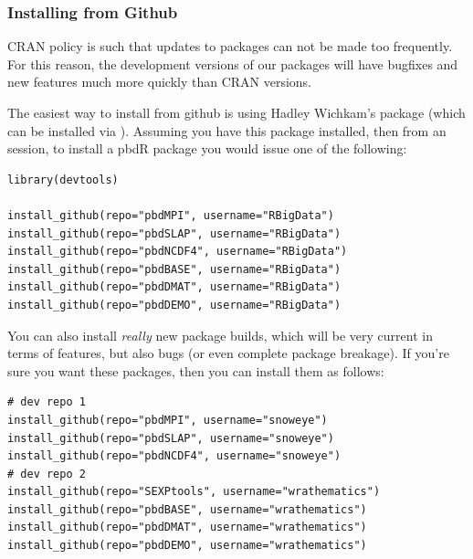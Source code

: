 \subsubsection{Installing from Github}
CRAN policy is such that updates to packages can not be made too frequently.  For this reason, the development versions of our packages will have bugfixes and new features much more quickly than CRAN versions.  

The easiest way to install from github is using Hadley Wichkam's  package (which can be installed via ).  Assuming you have this package installed, then from an  session, to install a pbdR package you would issue one of the following:

\begin{lstlisting}[language=rr]
library(devtools)

install_github(repo="pbdMPI", username="RBigData")
install_github(repo="pbdSLAP", username="RBigData")
install_github(repo="pbdNCDF4", username="RBigData")
install_github(repo="pbdBASE", username="RBigData")
install_github(repo="pbdDMAT", username="RBigData")
install_github(repo="pbdDEMO", username="RBigData")
\end{lstlisting}

You can also install \emph{really} new package builds, which will be very current in terms of features, but also bugs (or even complete package breakage).  If you're sure you want these packages, then you can install them as follows:

\begin{lstlisting}[language=rr]
# dev repo 1
install_github(repo="pbdMPI", username="snoweye")
install_github(repo="pbdSLAP", username="snoweye")
install_github(repo="pbdNCDF4", username="snoweye")
# dev repo 2
install_github(repo="SEXPtools", username="wrathematics")
install_github(repo="pbdBASE", username="wrathematics")
install_github(repo="pbdDMAT", username="wrathematics")
install_github(repo="pbdDEMO", username="wrathematics")
\end{lstlisting}
